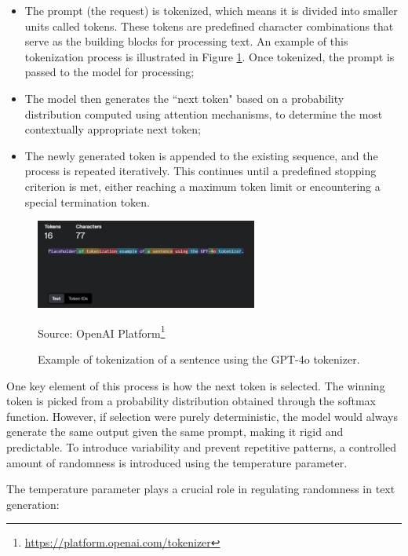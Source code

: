 \begin{itemize}
  \item The prompt (the request) is tokenized, which means it is divided into
    smaller units called tokens. These tokens are predefined character combinations
    that serve as the building blocks for processing text. An example of this
    tokenization process is illustrated in Figure \ref{fig:tokenization_example}.
    Once tokenized, the prompt is passed to the model for processing;

  \item The model then generates the ``next token" based on a probability
    distribution computed using attention mechanisms, to determine the most contextually
    appropriate next token;

  \item The newly generated token is appended to the existing sequence, and the
    process is repeated iteratively. This continues until a predefined stopping criterion
    is met, either reaching a maximum token limit or encountering a special
    termination token.
\end{itemize}

\begin{figure}[h!]
  \centering
  \includegraphics[width=0.65\textwidth]{images/tokenization_example.png}
  \caption{Example of tokenization of a sentence using the GPT-4o tokenizer.}
  { Source: OpenAI Platform\footnote{\url{https://platform.openai.com/tokenizer}}}
  \label{fig:tokenization_example}
\end{figure}

One key element of this process is how the next token is selected. The winning
token is picked from a probability distribution obtained through the softmax
function. However, if selection were purely deterministic, the model would always
generate the same output given the same prompt, making it rigid and predictable.
To introduce variability and prevent repetitive patterns, a controlled amount of
randomness is introduced using the temperature parameter.

The temperature parameter plays a crucial role in regulating randomness in text
generation:

